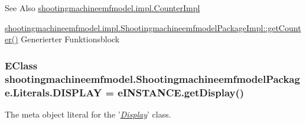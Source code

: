 \begin{DoxySeeAlso}{See Also}
\hyperlink{classshootingmachineemfmodel_1_1impl_1_1_counter_impl}{shootingmachineemfmodel.\-impl.\-Counter\-Impl} 

\hyperlink{classshootingmachineemfmodel_1_1impl_1_1_shootingmachineemfmodel_package_impl_a4cc5fbe52e9a40ce34ed89a9eeeb5b29}{shootingmachineemfmodel.\-impl.\-Shootingmachineemfmodel\-Package\-Impl\-::get\-Counter()} Generierter Funktionsblock 
\end{DoxySeeAlso}
\hypertarget{interfaceshootingmachineemfmodel_1_1_shootingmachineemfmodel_package_1_1_literals_ab8f98900ea17ced20aa67f00e65df0ac}{
\subsubsection[{D\-I\-S\-P\-L\-A\-Y}]{\setlength{\rightskip}{0pt plus 5cm}E\-Class shootingmachineemfmodel.\-Shootingmachineemfmodel\-Package.\-Literals.\-D\-I\-S\-P\-L\-A\-Y = e\-I\-N\-S\-T\-A\-N\-C\-E.\-get\-Display()}}\label{interfaceshootingmachineemfmodel_1_1_shootingmachineemfmodel_package_1_1_literals_ab8f98900ea17ced20aa67f00e65df0ac}
The meta object literal for the '\hyperlink{classshootingmachineemfmodel_1_1impl_1_1_display_impl}{{\itshape Display}}' class.

